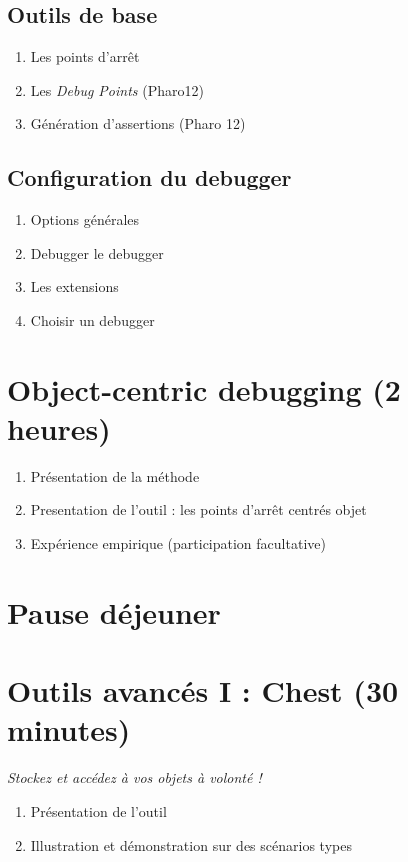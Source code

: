 \documentclass[manuscript, language=english, language=french, nonacm]{acmart}
\begin{document}
\subsection{Outils de base}

\begin{enumerate}
    \item Les points d'arrêt
    \item Les \textit{Debug Points} (Pharo12)        
    \item Génération d'assertions (Pharo 12)
\end{enumerate}

\subsection{Configuration du debugger}

\begin{enumerate}
    \item Options générales
    \item Debugger le debugger
    \item Les extensions
    \item Choisir un debugger
\end{enumerate}

\section{Object-centric debugging (2 heures)}

\begin{enumerate}
    \item Présentation de la méthode
    \item Presentation de l'outil : les points d'arrêt centrés objet
    \item Expérience empirique (participation facultative)
\end{enumerate}

\section*{Pause déjeuner}

\newpage
\section{Outils avancés I : Chest (30 minutes)}

\textit{Stockez et accédez à vos objets à volonté !}

\begin{enumerate}
    \item Présentation de l'outil
    \item Illustration et démonstration sur des scénarios types
\end{enumerate}
\end{document}
